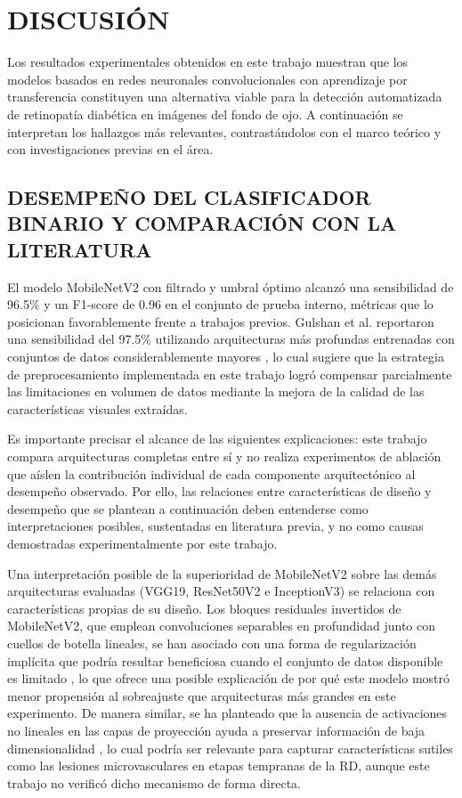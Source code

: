 \chapter{DISCUSIÓN} \label{chap:discusion}

Los resultados experimentales obtenidos en este trabajo muestran que los modelos basados
en redes neuronales convolucionales con aprendizaje por transferencia constituyen una
alternativa viable para la detección automatizada de retinopatía diabética en imágenes
del fondo de ojo. A continuación se interpretan los hallazgos más relevantes,
contrastándolos con el marco teórico y con investigaciones previas en el área.

\section{DESEMPEÑO DEL CLASIFICADOR BINARIO Y COMPARACIÓN CON LA LITERATURA}

El modelo MobileNetV2 con filtrado y umbral óptimo alcanzó una sensibilidad de 96.5\% y
un F1-score de 0.96 en el conjunto de prueba interno, métricas que lo posicionan
favorablemente frente a trabajos previos. Gulshan et al. reportaron una sensibilidad del
97.5\% utilizando arquitecturas más profundas entrenadas con conjuntos de datos
considerablemente mayores , lo cual sugiere que la
estrategia de preprocesamiento implementada en este trabajo logró compensar parcialmente
las limitaciones en volumen de datos mediante la mejora de la calidad de las
características visuales extraídas.

Es importante precisar el alcance de las siguientes explicaciones: este trabajo compara
arquitecturas completas entre sí y no realiza experimentos de ablación que aíslen la
contribución individual de cada componente arquitectónico al desempeño observado. Por
ello, las relaciones entre características de diseño y desempeño que se plantean a
continuación deben entenderse como interpretaciones posibles, sustentadas en literatura
previa, y no como causas demostradas experimentalmente por este trabajo.

Una interpretación posible de la superioridad de MobileNetV2 sobre las demás
arquitecturas evaluadas (VGG19, ResNet50V2 e InceptionV3) se relaciona con
características propias de su diseño. Los bloques residuales invertidos de MobileNetV2,
que emplean convoluciones separables en profundidad junto con cuellos de botella
lineales, se han asociado con una forma de regularización implícita que podría resultar
beneficiosa cuando el conjunto de datos disponible es limitado
, lo que ofrece una posible explicación de por qué
este modelo mostró menor propensión al sobreajuste que arquitecturas más grandes en este
experimento. De manera similar, se ha planteado que la ausencia de activaciones no
lineales en las capas de proyección ayuda a preservar información de baja
dimensionalidad , lo cual podría ser relevante para
capturar características sutiles como las lesiones microvasculares en etapas tempranas de
la RD, aunque este trabajo no verificó dicho mecanismo de forma directa.

